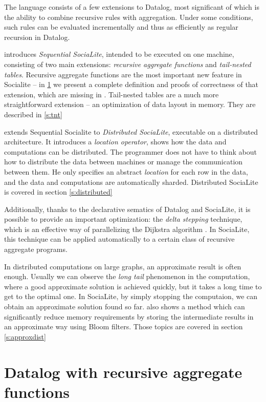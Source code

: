 \documentclass{pracamgr}
\theoremstyle{plain}
\theoremstyle{definition}
\theoremstyle{remark}
\begin{document}
The language consists of a few extensions to Datalog, most significant of which is the ability to combine recursive rules with aggregation. Under some conditions, such rules can be evaluated incrementally and thus as efficiently as regular recursion in Datalog.

\cite{socialite} introduces \emph{Sequential SociaLite}, intended to be executed on one machine, consisting of two main extensions: \emph{recursive aggregate functions} and \emph{tail-nested tables}. Recursive aggregate functions are the most important new feature in Socialite -- in \ref{s:recaggr} we present a complete definition and proofs of correctness of that extension, which are missing in \cite{socialite}. Tail-nested tables are a much more straightforward extension -- an optimization of data layout in memory. They are described in \ref{s:tnt}

\cite{distsoc} extends Sequential Socialite to \emph{Distributed SociaLite}, executable on a distributed architecture. It introduces a \emph{location operator}, shows how the data and computations can be distributed. The programmer does not have to think about how to distribute the data between machines or manage the communication between them. He only specifies an abstract \emph{location} for each row in the data, and the data and computations are automatically sharded. Distributed SociaLite is covered in section \ref{s:distributed}

Additionally, thanks to the declarative sematics of Datalog and SociaLite, it is possible to provide an important optimization: the \emph{delta stepping} technique, which is an effective way of parallelizing the Dijkstra algorithm \cite{deltastep}. In SociaLite, this technique can be applied automatically to a certain class of recursive aggregate programs.

In distributed computations on large graphs, an approximate result is often enough. Usually we can observe the \emph{long tail} phenomenon in the computation, where a good approximate solution is achieved quickly, but it takes a long time to get to the optimal one. In SociaLite, by simply stopping the computaion, we can obtain an approximate solution found so far. \cite{distsoc} also shows a method which can significantly reduce memory requirements by storing the intermediate results in an approximate way using Bloom filters. Those topics are covered in section \ref{s:approxdist}

\section{Datalog with recursive aggregate functions}\label{s:recaggr}
\end{document}
